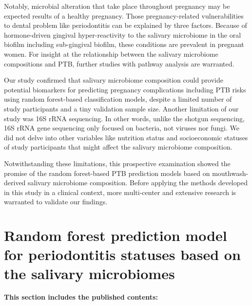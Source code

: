 \documentclass[11pt, a4paper, onecolumn, oneside]{report}
\begin{document}
            Notably, microbial alteration that take place throughout pregnancy may be expected results of a healthy pregnancy. Those pregnancy-related vulnerabilities to dental problem like periodontitis can be explained by three factors. Because of hormone-driven gingival hyper-reactivity to the salivary microbiome in the oral biofilm including sub-gingival biofilm, these conditions are prevalent in pregnant women. For insight at the relationship between the salivary microbiome compositions and PTB, further studies with pathway analysis are warranted.

            Our study confirmed that salivary microbiome composition could provide potential biomarkers for predicting pregnancy complications including PTB risks using random forest-based classification models, despite a limited number of study participants and a tiny validation sample size. Another limitation of our study was 16S rRNA sequencing. In other words, unlike the shotgun sequencing, 16S rRNA gene sequencing only focused on bacteria, not viruses nor fungi. We did not delve into other variables like nutrition status and socioeconomic statuses of study participants that might affect the salivary microbiome composition.

            Notwithstanding these limitations, this prospective examination showed the promise of the random forest-based PTB prediction models based on mouthwash-derived salivary microbiome composition. Before applying the methods developed in this study in a clinical context, more multi-center and extensive research is warranted to validate our findings.
        \newpage

    \section{Random forest prediction model for periodontitis statuses based on the salivary microbiomes}
        \label{section:Periodontitis}

        \textbf{This section includes the published contents:} \\
\end{document}
